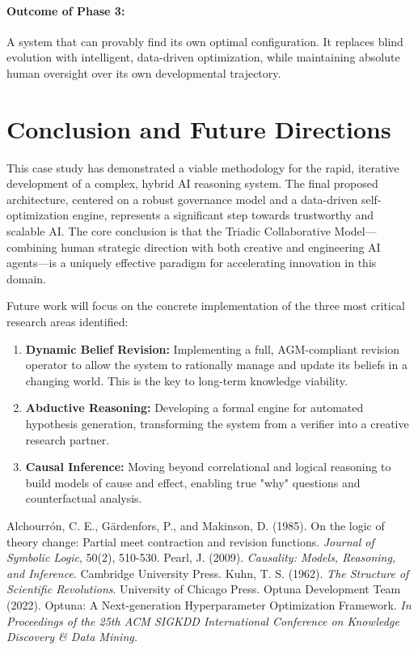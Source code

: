 \documentclass[11pt, a4paper]{article}
\begin{document}
\paragraph{Outcome of Phase 3:} A system that can provably find its own optimal configuration. It replaces blind evolution with intelligent, data-driven optimization, while maintaining absolute human oversight over its own developmental trajectory.

\section{Conclusion and Future Directions}
\label{sec:conclusion}

This case study has demonstrated a viable methodology for the rapid, iterative development of a complex, hybrid AI reasoning system. The final proposed architecture, centered on a robust governance model and a data-driven self-optimization engine, represents a significant step towards trustworthy and scalable AI. The core conclusion is that the Triadic Collaborative Model—combining human strategic direction with both creative and engineering AI agents—is a uniquely effective paradigm for accelerating innovation in this domain.

Future work will focus on the concrete implementation of the three most critical research areas identified:
\begin{enumerate}
    \item \textbf{Dynamic Belief Revision:} Implementing a full, AGM-compliant revision operator to allow the system to rationally manage and update its beliefs in a changing world. This is the key to long-term knowledge viability.
    \item \textbf{Abductive Reasoning:} Developing a formal engine for automated hypothesis generation, transforming the system from a verifier into a creative research partner.
    \item \textbf{Causal Inference:} Moving beyond correlational and logical reasoning to build models of cause and effect, enabling true "why" questions and counterfactual analysis.
\end{enumerate}

\begin{thebibliography}{9}
     Alchourrón, C. E., Gärdenfors, P., and Makinson, D. (1985). On the logic of theory change: Partial meet contraction and revision functions. \textit{Journal of Symbolic Logic}, 50(2), 510-530.
     Pearl, J. (2009). \textit{Causality: Models, Reasoning, and Inference}. Cambridge University Press.
     Kuhn, T. S. (1962). \textit{The Structure of Scientific Revolutions}. University of Chicago Press.
     Optuna Development Team (2022). Optuna: A Next-generation Hyperparameter Optimization Framework. \textit{In Proceedings of the 25th ACM SIGKDD International Conference on Knowledge Discovery \& Data Mining.}
\end{thebibliography}
\end{document}
